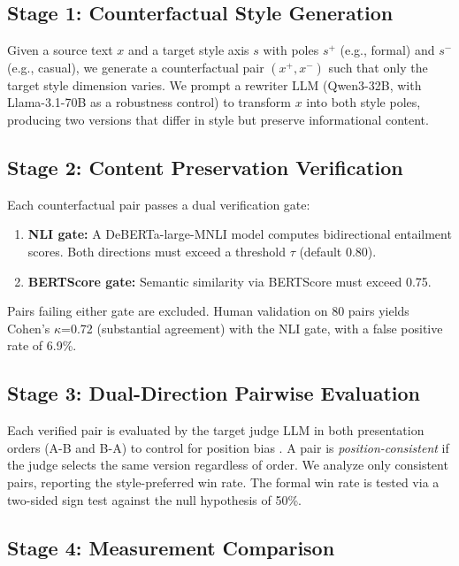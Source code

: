 \documentclass[11pt,a4paper]{article}
\begin{document}
\subsection{Stage 1: Counterfactual Style Generation}

Given a source text $x$ and a target style axis $s$ with poles $s^+$ (e.g., formal) and $s^-$ (e.g., casual), we generate a counterfactual pair $(x^+, x^-)$ such that only the target style dimension varies.
We prompt a rewriter LLM (Qwen3-32B, with Llama-3.1-70B as a robustness control) to transform $x$ into both style poles, producing two versions that differ in style but preserve informational content.

\subsection{Stage 2: Content Preservation Verification}

Each counterfactual pair passes a dual verification gate:
\begin{enumerate}[nosep,leftmargin=*]
\item \textbf{NLI gate:} A DeBERTa-large-MNLI model \citep{he2021deberta} computes bidirectional entailment scores. Both directions must exceed a threshold $\tau$ (default 0.80).
\item \textbf{BERTScore gate:} Semantic similarity via BERTScore \citep{zhang2020bertscore} must exceed 0.75.
\end{enumerate}
Pairs failing either gate are excluded.
Human validation on 80 pairs yields Cohen's $\kappa$=0.72 (substantial agreement) with the NLI gate, with a false positive rate of 6.9\%.

\subsection{Stage 3: Dual-Direction Pairwise Evaluation}

Each verified pair is evaluated by the target judge LLM in both presentation orders (A-B and B-A) to control for position bias \citep{wang2024faireval}.
A pair is \emph{position-consistent} if the judge selects the same version regardless of order.
We analyze only consistent pairs, reporting the style-preferred win rate.
The formal win rate is tested via a two-sided sign test against the null hypothesis of 50\%.

\subsection{Stage 4: Measurement Comparison}
\end{document}
